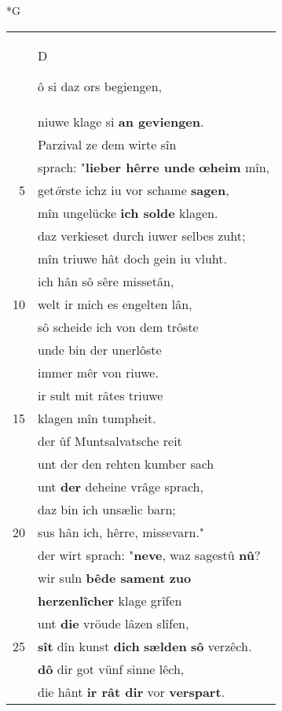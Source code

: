 \documentclass[8pt,a4paper,notitlepage]{article}
\begin{document}
\begin{table}[ht]
\begin{minipage}[t]{0.5\linewidth}
\small
\begin{center}*G
\end{center}
\begin{tabular}{rl}
 & \begin{large}D\end{large}ô si daz ors begiengen,\\ 
 & niuwe klage si \textbf{an geviengen}.\\ 
 & Parzival ze dem wirte sîn\\ 
 & sprach: "\textbf{lieber hêrre unde} \textbf{œheim} mîn,\\ 
5 & get\textit{ö}rste ichz iu vor schame \textbf{sagen},\\ 
 & mîn ungelücke \textbf{ich solde} klagen.\\ 
 & daz verkieset durch iuwer selbes zuht;\\ 
 & mîn triuwe hât doch gein iu vluht.\\ 
 & ich hân sô sêre missetân,\\ 
10 & welt ir mich es engelten lân,\\ 
 & sô scheide ich von dem trôste\\ 
 & unde bin der unerlôste\\ 
 & immer mêr von riuwe.\\ 
 & ir sult mit râtes triuwe\\ 
15 & klagen mîn tumpheit.\\ 
 & der ûf Muntsalvatsche reit\\ 
 & unt der den rehten kumber sach\\ 
 & unt \textbf{der} deheine vrâge sprach,\\ 
 & daz bin ich unsælic barn;\\ 
20 & sus hân ich, hêrre, missevarn."\\ 
 & der wirt sprach: "\textbf{neve}, waz sagestû \textbf{nû}?\\ 
 & wir suln \textbf{bêde sament} \textbf{zuo}\\ 
 & \textbf{herzenlîcher} klage grîfen\\ 
 & unt \textbf{die} vröude lâzen slîfen,\\ 
25 & \textbf{sît} dîn kunst \textbf{dich} \textbf{sælden} \textbf{sô} verzêch.\\ 
 & \textbf{dô} dir got vünf sinne lêch,\\ 
 & die hânt \textbf{ir rât dir} vor \textbf{verspart}.\\ 

\end{tabular}
\end{minipage}
\end{table}
\end{document}
